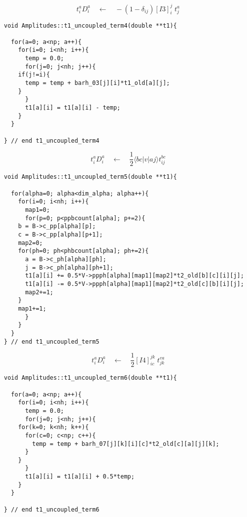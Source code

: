 %
\begin{equation*}
t_i^aD_i^a\quad \leftarrow \quad-(1-\delta_{ij})[I3]_i^j\phantom{.}t_{j}^{a}\nonumber
\end{equation*}
%
\begin{lstlisting}[label={list:impl:t1term4},caption={implementation of the amp1 class function t1\_uncoupled\_term4()}]
void Amplitudes::t1_uncoupled_term4(double **t1){
 
  for(a=0; a<np; a++){
    for(i=0; i<nh; i++){
      temp = 0.0;
      for(j=0; j<nh; j++){
	if(j!=i){
	  temp = temp + barh_03[j][i]*t1_old[a][j];
	}
      }
      t1[a][i] = t1[a][i] - temp;
    }
  }
  
} // end t1_uncoupled_term4
\end{lstlisting}
%
\begin{equation*}
t_i^aD_i^a\quad \leftarrow \quad\frac{1}{2}\langle bc|v|aj\rangle t_{ij}^{bc}\nonumber
\end{equation*}
%
\begin{lstlisting}[label={list:impl:t1term5},caption={implementation of the amp1 class function t1\_uncoupled\_term5()}]
void Amplitudes::t1_uncoupled_term5(double **t1){
  
  for(alpha=0; alpha<dim_alpha; alpha++){
    for(i=0; i<nh; i++){
      map1=0;
      for(p=0; p<ppbcount[alpha]; p+=2){
	b = B->c_pp[alpha][p];
	c = B->c_pp[alpha][p+1];
	map2=0;
	for(ph=0; ph<phbcount[alpha]; ph+=2){
	  a = B->c_ph[alpha][ph];
	  j = B->c_ph[alpha][ph+1];
	  t1[a][i] += 0.5*V->ppph[alpha][map1][map2]*t2_old[b][c][i][j];
	  t1[a][i] -= 0.5*V->ppph[alpha][map1][map2]*t2_old[c][b][i][j];
	  map2+=1;
	}
	map1+=1;
      }
    }
  }
} // end t1_uncoupled_term5
\end{lstlisting}


\begin{equation*}
t_i^aD_i^a\quad \leftarrow \quad\frac{1}{2}[I4]_{ic}^{jk}\phantom{.}t_{jk}^{ca}\nonumber
\end{equation*}

\begin{lstlisting}[label={list:impl:t1term6},caption={implementation of the amp1 class function t1\_uncoupled\_term6()}]
void Amplitudes::t1_uncoupled_term6(double **t1){
  
  for(a=0; a<np; a++){
    for(i=0; i<nh; i++){
      temp = 0.0;
      for(j=0; j<nh; j++){
	for(k=0; k<nh; k++){
	  for(c=0; c<np; c++){
	    temp = temp + barh_07[j][k][i][c]*t2_old[c][a][j][k];
	  }
	}
      }
      t1[a][i] = t1[a][i] + 0.5*temp;
    }
  }

} // end t1_uncoupled_term6
\end{lstlisting}


